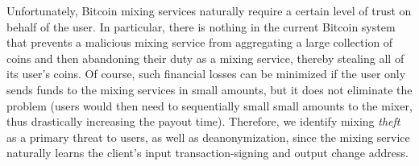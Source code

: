 Unfortunately, Bitcoin mixing services naturally require a certain level of trust on behalf of the user. In particular, there is nothing in the current Bitcoin system that prevents a malicious mixing service from aggregating a large collection of coins and then abandoning their duty as a mixing service, thereby stealing all of its user's coins. Of course, such financial losses can be minimized if the user only sends funds to the mixing services in small amounts, but it does not eliminate the problem (users would then need to sequentially small small amounts to the mixer, thus drastically increasing the payout time). Therefore, we identify mixing \emph{theft} as a primary threat to users, as well as deanonymization, since the mixing service naturally learns the client's input transaction-signing and output change address.


